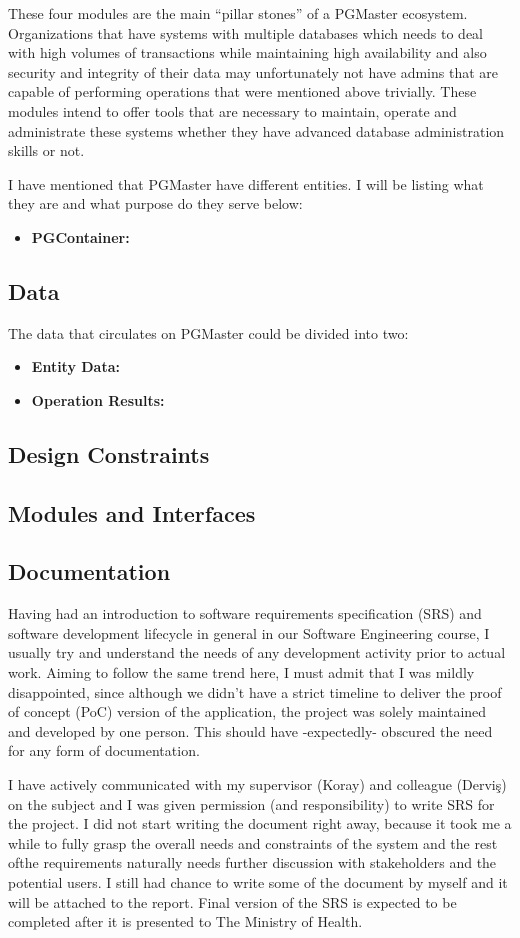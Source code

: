 These four modules are the main ``pillar stones'' of a PGMaster ecosystem. 
Organizations that have systems with multiple databases which needs to deal 
with high volumes of transactions while maintaining high availability and 
also security and integrity of their data may unfortunately not have admins 
that are capable of performing operations that were mentioned above trivially. 
These modules intend to offer tools that are necessary to maintain, operate 
and administrate these systems whether they have advanced database 
administration skills or not.
\par
I have mentioned that PGMaster have different entities. I will be listing 
what they are and what purpose do they serve below:
\begin{itemize}
    \item \textbf{PGContainer:} 
\end{itemize}

\subsection{Data}
The data that circulates on PGMaster could be divided into two:
\begin{itemize}
    \item \textbf{Entity Data:}
    \item \textbf{Operation Results:}
\end{itemize}
\subsection{Design Constraints}
\subsection{Modules and Interfaces}
\subsection{Documentation}

Having had an introduction to software requirements specification (SRS) and 
software development lifecycle in general in our Software Engineering course, 
I usually try and understand the needs of any development activity prior to 
actual work. Aiming to follow the same trend here, I must admit that I was 
mildly disappointed, since although we didn't have a strict timeline to 
deliver the proof of concept (PoC) version of the application, the project 
was solely maintained and developed by one person. This should have 
-expectedly- obscured the need for any form of documentation.
\par I have actively communicated with my supervisor (Koray) and colleague 
(Derviş) on the subject and I was given permission (and responsibility) to 
write SRS for the project. I did not start writing the document right away, 
because it took me a while to fully grasp the overall needs and constraints 
of the system and the rest ofthe requirements naturally needs further 
discussion with stakeholders and the potential users. I still had chance to 
write some of the document by myself and it will be attached to the report. 
Final version of the SRS is expected to be completed after it is presented 
to The Ministry of Health.

